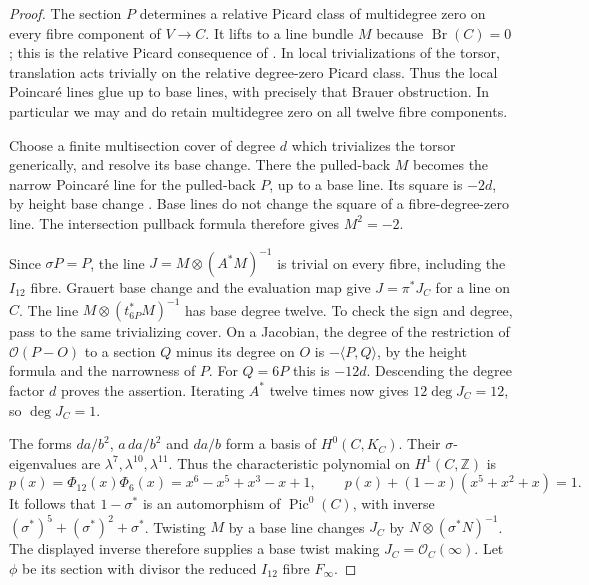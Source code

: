 \begin{proof}
The section $P$ determines a relative
Picard class of multidegree zero on
every fibre component of $V\to C$.
It lifts to a line bundle $M$ because
$\operatorname{Br}(C)=0$; this is the
relative Picard consequence of
\cite[Proposition 0.9.2 and the opening
of Section 4.2, p.370]{CDL24}.
In local trivializations of the torsor,
translation acts trivially on the
relative degree-zero Picard class.
Thus the local Poincar\'e lines glue
up to base lines, with precisely that
Brauer obstruction. In particular we
may and do retain multidegree zero
on all twelve fibre components.

Choose a finite multisection cover of
degree $d$ which trivializes the torsor
generically, and resolve its base change.
There the pulled-back $M$ becomes the
narrow Poincar\'e line for the pulled-back
$P$, up to a base line. Its square is
$-2d$, by height base change
\cite[Proposition 8.12, equation (8.25)]{Shioda90}.
Base lines do not change the square
of a fibre-degree-zero line. The
intersection pullback formula therefore
gives $M^2=-2$.

Since $\sigma P=P$, the line
$J=M\otimes(A^*M)^{-1}$ is trivial
on every fibre, including the
$I_{12}$ fibre. Grauert base change
and the evaluation map give
$J=\pi^*J_C$ for a line on $C$.
The line $M\otimes(t_{6P}^*M)^{-1}$
has base degree twelve. To check the
sign and degree, pass to the same
trivializing cover. On a Jacobian,
the degree of the restriction of
$\mathcal O(P-O)$ to a section $Q$
minus its degree on $O$ is
$-\langle P,Q\rangle$, by the height
formula and the narrowness of $P$.
For $Q=6P$ this is $-12d$.
Descending the degree factor $d$
proves the assertion. Iterating $A^*$
twelve times now gives
$12\deg J_C=12$, so $\deg J_C=1$.

The forms $da/b^2$, $a\,da/b^2$ and
$da/b$ form a basis of $H^0(C,K_C)$.
Their $\sigma$-eigenvalues are
$\lambda^7,\lambda^{10},\lambda^{11}$.
Thus the characteristic polynomial
on $H^1(C,\mathbb Z)$ is
\[
 p(x)=\Phi_{12}(x)\Phi_6(x)
     =x^6-x^5+x^3-x+1,
 \qquad
 p(x)+(1-x)(x^5+x^2+x)=1.
\]
It follows that $1-\sigma^*$ is an
automorphism of $\operatorname{Pic}^0(C)$,
with inverse $(\sigma^*)^5+(\sigma^*)^2+\sigma^*$.
Twisting $M$ by a base line changes
$J_C$ by $N\otimes(\sigma^*N)^{-1}$.
The displayed inverse therefore supplies
a base twist making
$J_C=\mathcal O_C(\infty)$.
Let $\phi$ be its section with divisor
the reduced $I_{12}$ fibre $F_\infty$.


\end{proof}
